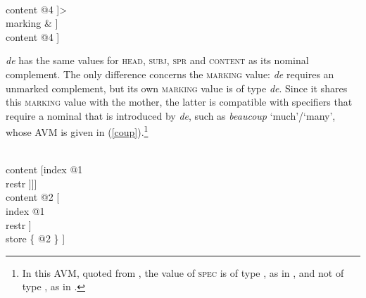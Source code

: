 \documentclass[output=paper
	        ,collection
	        ,collectionchapter
 	        ,biblatex
                ,babelshorthands
                ,newtxmath
                ,draftmode
                ,colorlinks, citecolor=brown
]{langscibook}
\begin{document}
\begin{exe} 
\ex\label{de} 
\begin{avm} 
[category [head & @1                                    \\
           subj & @A                                    \\
           spr  & @B                                     \\
           comps & <[category [head & @1                 \\
                               subj & @A                 \\
                               spr  & @B                 \\
                               comps & < >              \\
                               marking & \type{unmarked}] \\
                     content @4 ]>                       \\ 
           marking & ]                          \\
 content @4 ] 
\end{avm}
\end{exe} 

\noindent
\emph{de} has the same values for \textsc{head}, \textsc{subj}, \textsc{spr} and 
\textsc{content} as its nominal complement. 
The only difference concerns the \textsc{marking} value: \emph{de} requires an 
unmarked complement, but its own \textsc{marking} value is of type \emph{de}. 
Since it shares this \textsc{marking} value with the mother, the latter is 
compatible with specifiers that require a nominal that is introduced by \emph{de}, 
such as \emph{beaucoup} `much'/`many', whose AVM is given in 
(\ref{coup}).\footnote{In this AVM, quoted from \citet[18]{Abeilleetal04}, 
the value of \textsc{spec} is of type , as in \citet{ps2}, and not of type 
, as in \citet{GS00}.}  

\begin{exe} 
\ex\label{coup} 
\begin{avm} 
[category|head [\type{adverb}                                 \\
                spec|loc [category [head    & \type{noun}     \\
                                    spr     & \type{nelist}   \\
                                    marking & \type{de}]      \\
                          content [index @1                    \\
                                   restr \avmbox{$\Sigma$} ]]] \\ 
 content @2 [         \\
               index @1                  \\
               restr \avmbox{$\Sigma$} ] \\
 store \{ @2 \} ]
\end{avm}
\end{exe} 
\end{document}
